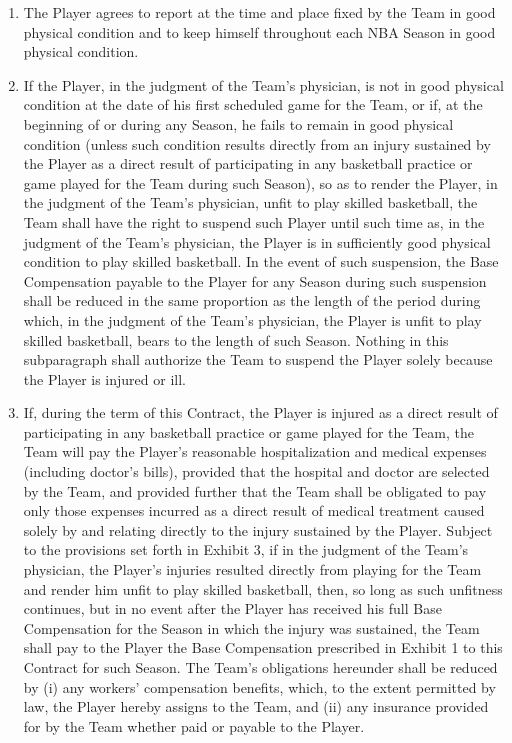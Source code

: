 \documentclass[
]{book}
\providecommand{\tightlist}{%
  \setlength{\itemsep}{0pt}\setlength{\parskip}{0pt}}
\begin{document}
\begin{enumerate}
\def\labelenumi{(\alph{enumi})}
\tightlist
\item
  The Player agrees to report at the time and place fixed by the Team in good physical condition and to keep himself throughout each NBA Season in good physical condition.
\item
  If the Player, in the judgment of the Team's physician, is not in good physical condition at the date of his first scheduled game for the Team, or if, at the beginning of or during any Season, he fails to remain in good physical condition (unless such condition results directly from an injury sustained by the Player as a direct result of participating in any basketball practice or game played for the Team during such Season), so as to render the Player, in the judgment of the Team's physician, unfit to play skilled basketball, the Team shall have the right to suspend such Player until such time as, in the judgment of the Team's physician, the Player is in sufficiently good physical condition to play skilled basketball. In the event of such suspension, the Base Compensation payable to the Player for any Season during such suspension shall be reduced in the same proportion as the length of the period during which, in the judgment of the Team's physician, the Player is unfit to play skilled basketball, bears to the length of such Season. Nothing in this subparagraph shall authorize the Team to suspend the Player solely because the Player is injured or ill.
\item
  If, during the term of this Contract, the Player is injured as a direct result of participating in any basketball practice or game played for the Team, the Team will pay the Player's reasonable hospitalization and medical expenses (including doctor's bills), provided that the hospital and doctor are selected by the Team, and provided further that the Team shall be obligated to pay only those expenses incurred as a direct result of medical treatment caused solely by and relating directly to the injury sustained by the Player. Subject to the provisions set forth in Exhibit 3, if in the judgment of the Team's physician, the Player's injuries resulted directly from playing for the Team and render him unfit to play skilled basketball, then, so long as such unfitness continues, but in no event after the Player has received his full Base Compensation for the Season in which the injury was sustained, the Team shall pay to the Player the Base Compensation prescribed in Exhibit 1 to this Contract for such Season. The Team's obligations hereunder shall be reduced by (i) any workers' compensation benefits, which, to the extent permitted by law, the Player hereby assigns to the Team, and (ii) any insurance provided for by the Team whether paid or payable to the Player.

\end{enumerate}
\end{document}
